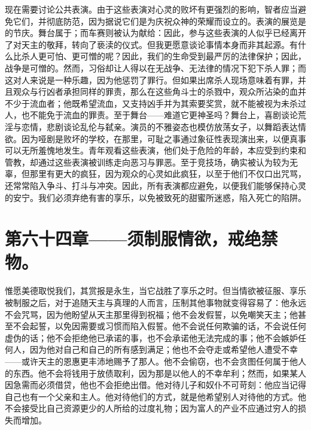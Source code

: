 现在需要讨论公共表演。由于这些表演对心灵的败坏有更强烈的影响，智者应当避免它们，并彻底防范，因为据说它们是为庆祝众神的荣耀而设立的。表演的展览是的节庆。舞台属于；而车赛则被认为献给：因此，参与这些表演的人似乎已经离开了对天主的敬拜，转向了亵渎的仪式。但我更愿意谈论事情本身而非其起源。有什么比杀人更可怕、更可憎的呢？因此，我们的生命受到最严厉的法律保护；因此，战争是可憎的。然而，习俗却让人得以在无战争、无法律的情况下犯下杀人罪；而这对人来说是一种乐趣，因为他惩罚了罪行。但如果出席杀人现场意味着有罪，并且观众与行凶者承担同样的罪责，那么在这些角斗士的杀戮中，观众所沾染的血并不少于流血者；他既希望流血，又支持凶手并为其索要奖赏，就不能被视为未杀过人，也不能免于流血的罪责。至于舞台——难道它更神圣吗？舞台上，喜剧谈论荒淫与恋情，悲剧谈论乱伦与弑亲。演员的不雅姿态也模仿放荡女子，以舞蹈表达情欲。因为哑剧是败坏的学校，在那里，可耻之事通过象征性表现演出来，以便真事可以无所羞愧地发生。青年观看这些表演，他们处于危险的年龄，本应受到约束和管教，却通过这些表演被训练走向恶习与罪恶。至于竞技场，确实被认为较为无辜，但那里有更大的疯狂，因为观众的心灵如此疯狂，以至于他们不仅口出咒骂，还常常陷入争斗、打斗与冲突。因此，所有表演都应避免，以便我们能够保持心灵的安宁。我们必须弃绝有害的享乐，以免被致死的甜蜜所迷惑，陷入死亡的陷阱。\par


\section{第六十四章——须制服情欲，戒绝禁物。}

惟愿美德取悦我们，其赏报是永生，当它战胜了享乐之时。但当情欲被征服、享乐被制服之后，对于追随天主与真理的人而言，压制其他事物就变得容易了：他永远不会咒骂，因为他盼望从天主那里得到祝福；他不会发假誓，以免嘲笑天主；他甚至不会起誓，以免因需要或习惯而陷入假誓。他不会说任何欺骗的话，不会说任何虚伪的话；他不会拒绝他已承诺的事，也不会承诺他无法完成的事；他不会嫉妒任何人，因为他对自己和自己的所有感到满足；他也不会夺走或希望他人遭受不幸——或许天主的恩惠更丰沛地赐予了那人。他不会偷窃，也不会贪图任何属于他人的东西。他不会将钱用于放债取利，因为那是以他人的不幸牟利；然而，如果某人因急需而必须借贷，他也不会拒绝出借。他对待儿子和奴仆不可苛刻：他应当记得自己也有一个父亲和主人。他对待他们的方式，就是他希望别人对待他的方式。他不会接受比自己资源更少的人所给的过度礼物；因为富人的产业不应通过穷人的损失而增加。\par

